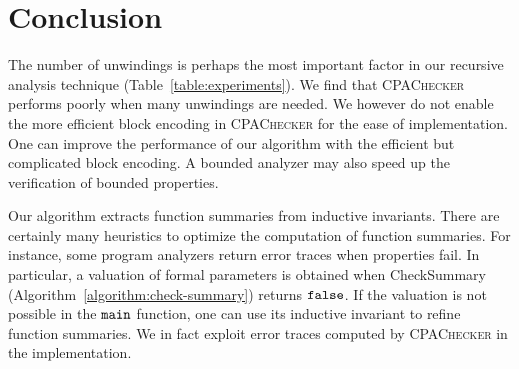 
\chapter{Conclusion}\label{ch:conclusion}


The number of unwindings is perhaps the most important factor in our
recursive analysis technique (Table~\ref{table:experiments}). We find
that \textsc{CPAChecker} performs poorly when many unwindings are
needed. We however do not enable the more efficient block encoding in
\textsc{CPAChecker} for the ease of implementation. One can improve
the performance of our algorithm with the efficient but complicated
block encoding. A bounded analyzer may also speed up the
verification of bounded properties. 

Our algorithm extracts function summaries from inductive invariants. 
There are certainly many heuristics to optimize the computation of
function summaries. For instance, some program analyzers return error
traces when properties fail. In particular, a valuation of formal
parameters is obtained when \textmd{CheckSummary}
(Algorithm~\ref{algorithm:check-summary}) returns $\mathtt{false}$. If the
valuation is not possible in the $\mathtt{{main}}$ function, one can use
its inductive invariant to refine function summaries. We in 
fact exploit error traces computed by \textsc{CPAChecker} in the
implementation. 
